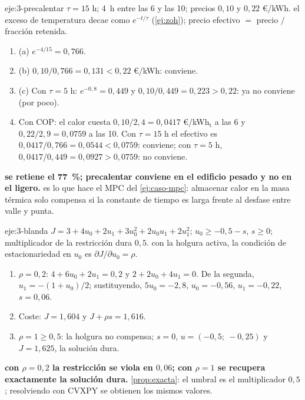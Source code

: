 \begin{solucion}{eje:3-precalentar}
\datos $\tau=15$ h; 4~h entre las 6 y las 10; precios $0{,}10$ y $0{,}22$ €/kWh.
\planteamiento el exceso de temperatura decae como $e^{-t/\tau}$ (\cref{ej:zoh}); precio efectivo $=$ precio $/$ fracción retenida.
\pasos
\begin{enumerate}[label=\arabic*.]
  \item (a) $e^{-4/15}=0{,}766$.
  \item (b) $0{,}10/0{,}766=0{,}131<0{,}22$ €/kWh: conviene.
  \item (c) Con $\tau=5$ h: $e^{-0{,}8}=0{,}449$ y $0{,}10/0{,}449=0{,}223>0{,}22$: ya no conviene (por poco).
  \item Con COP: el calor cuesta $0{,}10/2{,}4=0{,}0417$ €/kWh$_{\mathrm{t}}$ a las 6 y $0{,}22/2{,}9=0{,}0759$ a las 10. Con $\tau=15$ h el efectivo es $0{,}0417/0{,}766=0{,}0544<0{,}0759$: conviene; con $\tau=5$ h, $0{,}0417/0{,}449=0{,}0927>0{,}0759$: no conviene.
\end{enumerate}
\resultado \textbf{se retiene el 77~\%; precalentar conviene en el edificio pesado y no en el ligero.}
\comprobacion es lo que hace el MPC del \cref{ej:caso-mpc}: almacenar calor en la masa térmica solo compensa si la constante de tiempo es larga frente al desfase entre valle y punta.
\end{solucion}

\begin{solucion}{eje:3-blanda}
\datos $J=3+4u_0+2u_1+3u_0^{2}+2u_0u_1+2u_1^{2}$; $u_0\ge-0{,}5-s$, $s\ge0$; multiplicador de la restricción dura $0{,}5$.
\planteamiento con la holgura activa, la condición de estacionariedad en $u_0$ es $\partial J/\partial u_0=\rho$.
\pasos
\begin{enumerate}[label=\arabic*.]
  \item $\rho=0{,}2$: $4+6u_0+2u_1=0{,}2$ y $2+2u_0+4u_1=0$. De la segunda, $u_1=-(1+u_0)/2$; sustituyendo, $5u_0=-2{,}8$, $u_0=-0{,}56$, $u_1=-0{,}22$, $s=0{,}06$.
  \item Coste: $J=1{,}604$ y $J+\rho s=1{,}616$.
  \item $\rho=1\ge0{,}5$: la holgura no compensa; $s=0$, $u=(-0{,}5;\ -0{,}25)$ y $J=1{,}625$, la solución dura.
\end{enumerate}
\resultado \textbf{con $\rho=0{,}2$ la restricción se viola en $0{,}06$; con $\rho=1$ se recupera exactamente la solución dura.}
\comprobacion \cref{prop:exacta}: el umbral es el multiplicador $0{,}5$; resolviendo con CVXPY se obtienen los mismos valores.
\end{solucion}

